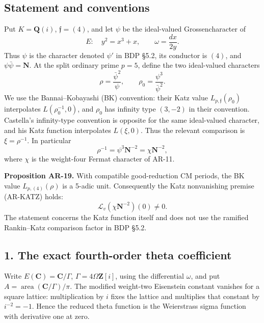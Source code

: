 \documentclass[11pt,a4paper]{article}
\begin{document}
\subsection{Statement and conventions}\label{statement-and-conventions}

Put \(K=\mathbf Q(i)\), \(\mathfrak f=(4)\), and let \(\psi\) be the
ideal-valued Grossencharacter of \[
E:\quad y^2=x^3+x,\qquad \omega=\frac{dx}{2y}.
\] Thus \(\psi\) is the character denoted \(\psi'\) in BDP §5.2, its
conductor is \((4)\), and \(\psi\bar\psi=\mathbf N\). At the split
ordinary prime \(p=5\), define the two ideal-valued characters \[
\rho=\frac{\bar\psi^2}{\psi},\qquad
\rho_0=\frac{\psi^3}{\bar\psi^2}.
\tag{AR19.1}
\] We use the Bannai--Kobayashi (BK) convention: their Katz value
\(L_{p,\mathfrak f}(\rho_0)\) interpolates \(L(\rho_0^{-1},0)\), and
\(\rho_0\) has infinity type \((3,-2)\) in their convention. Castella's
infinity-type convention is opposite for the same ideal-valued
character, and his Katz function interpolates \(L(\xi,0)\). Thus the
relevant comparison is \(\xi=\rho^{-1}\). In particular \[
\rho^{-1}=\psi^3\mathbf N^{-2}=\chi\mathbf N^{-2},
\] where \(\chi\) is the weight-four Fermat character of AR-11.

\textbf{Proposition AR-19.} With compatible good-reduction CM periods,
the BK value \(L_{p,(4)}(\rho)\) is a 5-adic unit. Consequently the Katz
nonvanishing premise (AR-KATZ) holds: \[
\mathcal L_v(\chi\mathbf N^{-2})(0)\ne0.
\tag{AR19.2}
\] The statement concerns the Katz function itself and does not use the
ramified Rankin--Katz comparison factor in BDP §5.2.

\subsection{1. The exact fourth-order theta
coefficient}\label{the-exact-fourth-order-theta-coefficient}

Write \(E(\mathbf C)=\mathbf C/\Gamma\), \(\Gamma=4\Omega\mathbf Z[i]\),
using the differential \(\omega\), and put
\(A=\operatorname{area}(\mathbf C/\Gamma)/\pi\). The modified weight-two
Eisenstein constant vanishes for a square lattice: multiplication by
\(i\) fixes the lattice and multiplies that constant by \(i^{-2}=-1\).
Hence the reduced theta function is the Weierstrass sigma function with
derivative one at zero.
\end{document}
